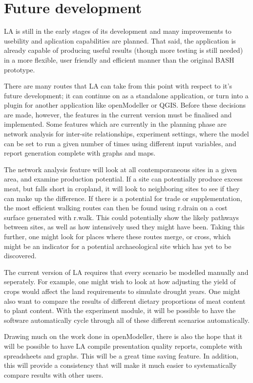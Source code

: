 \section{Future development} \label{FuturePlans} 

LA is still in the early stages of its development and many
improvements to usebility and aplication capabilities are planned. That said,
the application is already capable of producing useful results (though more
testing is still needed) in a more flexible, user friendly and efficient manner
than the original BASH prototype.

There are many routes that LA can take from this point with
respect to it's future development; it can continue on as a standalone
application, or turn into a plugin for another application like openModeller or
QGIS.  Before these decisions are made, however, the features in the current
version must be finalised and implemented.  Some features which are currently
in the planning phase are network analysis  for inter-site relationships,
experiment settings, where the model can be set to run a given number of times
using different input variables, and report generation complete with graphs and
maps. 

The network analysis feature will look at all contemporaneous sites in a given
area, and examine production potential.  If a site can potentially produce
excess meat, but falls short in cropland, it will look to neighboring sites to
see if they can make up the difference.  If there is a potential for trade or
supplementation, the most efficient walking routes can then be found using
r.drain on a cost surface generated with r.walk.  This could potentially show
the likely pathways between sites, as well as how intensively used they might
have been.  Taking this further, one might look for places where these routes
merge, or cross, which might be an indicator for a potential archaeological
site which has yet to be discovered.

The current version of LA requires that every scenario be modelled
manually and seperately.  For example, one might wish to look at how adjusting
the yield of crops would affect the land requirements to simulate drought
years.  One might also want to compare the results of different dietary
proportions of meat content to plant content.  With the experiment module, it
will be possible to have the software automatically cycle through all of these
different scenarios automatically.

Drawing much on the work done in openModeller, there is also the hope that it
will be possible to have LA compile presentation quality reports,
complete with spreadsheets and graphs.  This will be a great time saving
feature.  In addition, this will provide a consistency that will make it much
easier to systematically compare results with other users.

